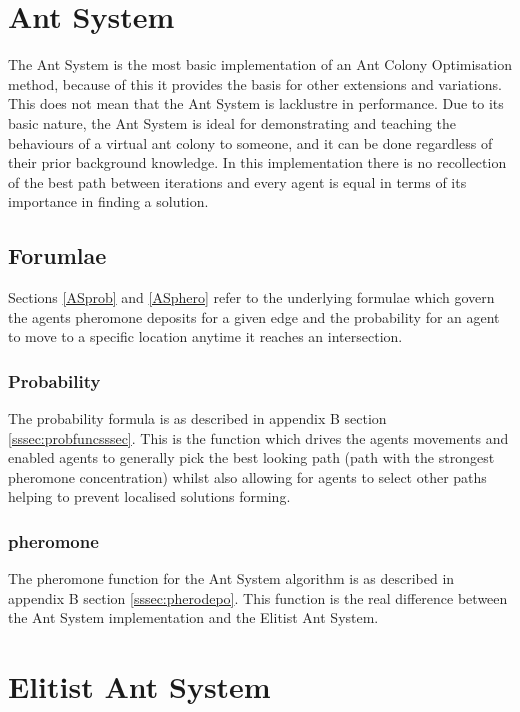 \section{Ant System}
\label{sec:AntSystem}
The Ant System is the most basic implementation of an Ant Colony Optimisation method, because of this it provides the basis for other extensions and variations. This does not mean that the Ant System is lacklustre in performance. Due to its basic nature, the Ant System is ideal for demonstrating and teaching the behaviours of a virtual ant colony to someone, and it can be done regardless of their prior background knowledge. In this implementation there is no recollection of the best path between iterations and every agent is equal in terms of its importance in finding a solution.

\subsection{Forumlae}

Sections \ref{ASprob} and \ref{ASphero} refer to the underlying formulae which govern the agents pheromone deposits for a given edge and the probability for an agent to move to a specific location anytime it reaches an intersection.

\subsubsection{Probability}

The probability formula is as described in appendix B section \ref{sssec:probfuncsssec}. This is the function which drives the agents movements and enabled agents to generally pick the best looking path (path with the strongest pheromone concentration) whilst also allowing for agents to select other paths helping to prevent localised solutions forming.

\label{ASprob}

\subsubsection{pheromone}

The pheromone function for the Ant System algorithm is as described in appendix B section \ref{sssec:pherodepo}. This function is the real difference between the Ant System implementation and the Elitist Ant System.

\label{ASphero}

\section{Elitist Ant System}

